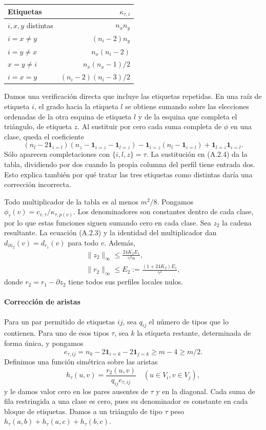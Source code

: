 \documentclass[spanish,11pt,a4paper]{article}
\begin{document}
{\begin{longtable}[]{@{}lr@{}}
\toprule\noalign{}
Etiquetas & \(\kappa_{\tau,i}\) \\
\midrule\noalign{}
\endhead
\bottomrule\noalign{}
\endlastfoot
\(i,x,y\) distintas & \(n_xn_y\) \\
\(i=x\ne y\) & \((n_i-2)n_y\) \\
\(i=y\ne x\) & \(n_x(n_i-2)\) \\
\(x=y\ne i\) & \(n_x(n_x-1)/2\) \\
\(i=x=y\) & \((n_i-2)(n_i-3)/2\) \\
\end{longtable}
}

Damos una verificación directa que incluye las etiquetas repetidas. En una raíz de etiqueta \(i\), el grado hacia la etiqueta \(l\) se obtiene sumando sobre las elecciones ordenadas de la otra esquina de etiqueta \(l\) y de la esquina que completa el triángulo, de etiqueta \(z\). Al sustituir por cero cada suma completa de \(\phi\) en una clase, queda el coeficiente \[(n_l-2\mathbf1_{i=l})
(n_z-\mathbf1_{i=z}-\mathbf1_{l=z})
-\mathbf1_{i=z}(n_l-\mathbf1_{i=l})
+\mathbf1_{l=z}\mathbf1_{i=l}.
\tag{A.2.4}\] Sólo aparecen completaciones con \(\{i,l,z\}=\tau\). La sustitución en (A.2.4) da la tabla, dividiendo por dos cuando la propia columna del perfil tiene entrada dos. Esto explica también por qué tratar las tres etiquetas como distintas daría una corrección incorrecta.

Todo multiplicador de la tabla es al menos \(m^2/8\). Pongamos \(\phi_\tau(v)=c_{v,\tau}/\kappa_{\tau,p(v)}\). Los denominadores son constantes dentro de cada clase, por lo que estas funciones siguen sumando cero en cada clase. Sea \(z_2\) la cadena resultante. La ecuación (A.2.3) y la identidad del multiplicador dan \(d_{\partial z_2}(v)=d_{r_1}(v)\) para todo \(v\). Además, \[\begin{gathered}
\|z_2\|_\infty\le\frac{24K_2E_1}{\gamma^2n},\\
\|r_2\|_\infty\le E_2:=\frac{(1+24K_2)E_1}{\gamma^2},
\end{gathered}
\tag{A.2.5}\] donde \(r_2=r_1-\partial z_2\) tiene todos sus perfiles locales nulos.

\paragraph{Corrección de aristas}\label{correcciuxf3n-de-aristas}

Para un par permitido de etiquetas \(ij\), sea \(q_{ij}\) el número de tipos que lo contienen. Para uno de esos tipos \(\tau\), sea \(k\) la etiqueta restante, determinada de forma única, y pongamos \[e_{\tau,ij}=n_k-2\mathbf1_{i=k}-2\mathbf1_{j=k}\ge m-4\ge m/2.\] Definimos una función simétrica sobre las aristas \[h_\tau(u,v)=\frac{r_2(u,v)}{q_{ij}e_{\tau,ij}}
\quad (u\in V_i,v\in V_j),\] y le damos valor cero en los pares ausentes de \(\tau\) y en la diagonal. Cada suma de fila restringida a una clase es cero, pues su denominador es constante en cada bloque de etiquetas. Damos a un triángulo de tipo \(\tau\) peso \(h_\tau(a,b)+h_\tau(a,c)+h_\tau(b,c)\).
\end{document}
